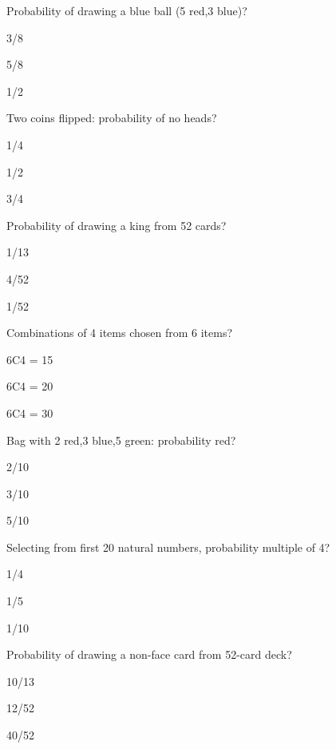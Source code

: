 \begin{enhancedmcq}{Probability of drawing a blue ball (5 red,3 blue)?}
\item 3/8
\item 5/8
\item 1/2

\end{enhancedmcq}
\begin{enhancedmcq}{Two coins flipped: probability of no heads?}
\item 1/4
\item 1/2
\item 3/4

\end{enhancedmcq}
\begin{enhancedmcq}{Probability of drawing a king from 52 cards?}
\item 1/13
\item 4/52
\item 1/52

\end{enhancedmcq}
\begin{enhancedmcq}{Combinations of 4 items chosen from 6 items?}
\item 6C4 = 15
\item 6C4 = 20
\item 6C4 = 30

\end{enhancedmcq}
\begin{enhancedmcq}{Bag with 2 red,3 blue,5 green: probability red?}
\item 2/10
\item 3/10
\item 5/10

\end{enhancedmcq}
\begin{enhancedmcq}{Selecting from first 20 natural numbers, probability multiple of 4?}
\item 1/4
\item 1/5
\item 1/10

\end{enhancedmcq}
\begin{enhancedmcq}{Probability of drawing a non-face card from 52-card deck?}
\item 10/13
\item 12/52
\item 40/52
\end{enhancedmcq}